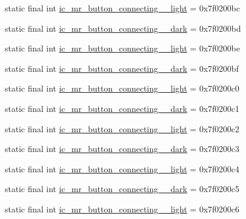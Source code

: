 \begin{CompactItemize}
\item 
static final int \hyperlink{classandroid_1_1support_1_1graphics_1_1drawable_1_1_r_1_1drawable_dd2bcf1a66e8536faf5e060f9a059fbd}{ic\_\-mr\_\-button\_\-connecting\_\_\-light} = 0x7f0200bc
\item 
static final int \hyperlink{classandroid_1_1support_1_1graphics_1_1drawable_1_1_r_1_1drawable_d13ebeda383890e2bf1cb9d5580b99e8}{ic\_\-mr\_\-button\_\-connecting\_\_\-dark} = 0x7f0200bd
\item 
static final int \hyperlink{classandroid_1_1support_1_1graphics_1_1drawable_1_1_r_1_1drawable_c20b8bb61ccd5e7881a3b434da5c0614}{ic\_\-mr\_\-button\_\-connecting\_\_\-light} = 0x7f0200be
\item 
static final int \hyperlink{classandroid_1_1support_1_1graphics_1_1drawable_1_1_r_1_1drawable_eb0bb07ed6f594747d6f2785fe1dd87b}{ic\_\-mr\_\-button\_\-connecting\_\_\-dark} = 0x7f0200bf
\item 
static final int \hyperlink{classandroid_1_1support_1_1graphics_1_1drawable_1_1_r_1_1drawable_35b969df939038b3ab6e51a255175c51}{ic\_\-mr\_\-button\_\-connecting\_\_\-light} = 0x7f0200c0
\item 
static final int \hyperlink{classandroid_1_1support_1_1graphics_1_1drawable_1_1_r_1_1drawable_ed062e2e645ad036f9f07efbc5d408a9}{ic\_\-mr\_\-button\_\-connecting\_\_\-dark} = 0x7f0200c1
\item 
static final int \hyperlink{classandroid_1_1support_1_1graphics_1_1drawable_1_1_r_1_1drawable_286b4a71ebc9f7ebb3f3fa01cd990e62}{ic\_\-mr\_\-button\_\-connecting\_\_\-light} = 0x7f0200c2
\item 
static final int \hyperlink{classandroid_1_1support_1_1graphics_1_1drawable_1_1_r_1_1drawable_af259d42519f168231c9fb26c75fe39a}{ic\_\-mr\_\-button\_\-connecting\_\_\-dark} = 0x7f0200c3
\item 
static final int \hyperlink{classandroid_1_1support_1_1graphics_1_1drawable_1_1_r_1_1drawable_4966d9a21278b6a6d4186ec5aed2c203}{ic\_\-mr\_\-button\_\-connecting\_\_\-light} = 0x7f0200c4
\item 
static final int \hyperlink{classandroid_1_1support_1_1graphics_1_1drawable_1_1_r_1_1drawable_9c3bf739adf51c82b20e1865fd0d2a6b}{ic\_\-mr\_\-button\_\-connecting\_\_\-dark} = 0x7f0200c5
\item 
static final int \hyperlink{classandroid_1_1support_1_1graphics_1_1drawable_1_1_r_1_1drawable_2f96bbdc012fcb72ca085312b2cfd321}{ic\_\-mr\_\-button\_\-connecting\_\_\-light} = 0x7f0200c6

\end{CompactItemize}
